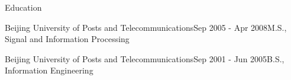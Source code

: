 \documentclass{resume} %
\begin{document}
\begin{rSection}{Education}
\begin{rSubsection}{Beijing University of Posts and Telecommunications}{Sep 2005 - Apr 2008}{M.S., Signal and Information Processing}{}
\end{rSubsection}

\begin{rSubsection}{Beijing University of Posts and Telecommunications}{Sep 2001 - Jun 2005}{B.S., Information Engineering}{}
\end{rSubsection}

\end{rSection}
\end{document}
